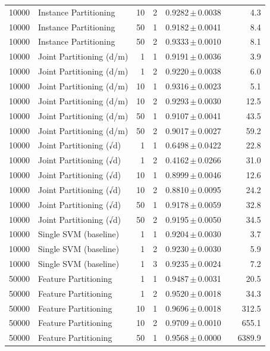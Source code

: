 \begin{table}[ht]
\begin{tabular}{rlrrccr}
10000 & Instance Partitioning & 10 & 2 & 0.9282\,$\pm$\,0.0038 &  & 4.3 \\
10000 & Instance Partitioning & 50 & 1 & 0.9182\,$\pm$\,0.0041 &  & 8.4 \\
10000 & Instance Partitioning & 50 & 2 & 0.9333\,$\pm$\,0.0010 &  & 8.1 \\
10000 & Joint Partitioning (d/m) & 1 & 1 & 0.9191\,$\pm$\,0.0036 &  & 3.9 \\
10000 & Joint Partitioning (d/m) & 1 & 2 & 0.9220\,$\pm$\,0.0038 &  & 6.0 \\
10000 & Joint Partitioning (d/m) & 10 & 1 & 0.9316\,$\pm$\,0.0023 &  & 5.1 \\
10000 & Joint Partitioning (d/m) & 10 & 2 & 0.9293\,$\pm$\,0.0030 &  & 12.5 \\
10000 & Joint Partitioning (d/m) & 50 & 1 & 0.9107\,$\pm$\,0.0041 &  & 43.5 \\
10000 & Joint Partitioning (d/m) & 50 & 2 & 0.9017\,$\pm$\,0.0027 &  & 59.2 \\
10000 & Joint Partitioning (√d) & 1 & 1 & 0.6498\,$\pm$\,0.0422 &  & 22.8 \\
10000 & Joint Partitioning (√d) & 1 & 2 & 0.4162\,$\pm$\,0.0266 &  & 31.0 \\
10000 & Joint Partitioning (√d) & 10 & 1 & 0.8999\,$\pm$\,0.0046 &  & 12.6 \\
10000 & Joint Partitioning (√d) & 10 & 2 & 0.8810\,$\pm$\,0.0095 &  & 24.2 \\
10000 & Joint Partitioning (√d) & 50 & 1 & 0.9178\,$\pm$\,0.0059 &  & 32.8 \\
10000 & Joint Partitioning (√d) & 50 & 2 & 0.9195\,$\pm$\,0.0050 &  & 34.5 \\
10000 & Single SVM (baseline) & 1 & 1 & 0.9204\,$\pm$\,0.0030 &  & 3.7 \\
10000 & Single SVM (baseline) & 1 & 2 & 0.9230\,$\pm$\,0.0030 &  & 5.9 \\
10000 & Single SVM (baseline) & 1 & 3 & 0.9235\,$\pm$\,0.0024 &  & 7.2 \\
50000 & Feature Partitioning & 1 & 1 & 0.9487\,$\pm$\,0.0031 &  & 20.5 \\
50000 & Feature Partitioning & 1 & 2 & 0.9520\,$\pm$\,0.0018 &  & 34.3 \\
50000 & Feature Partitioning & 10 & 1 & 0.9696\,$\pm$\,0.0018 &  & 312.5 \\
50000 & Feature Partitioning & 10 & 2 & 0.9709\,$\pm$\,0.0010 &  & 655.1 \\
50000 & Feature Partitioning & 50 & 1 & 0.9568\,$\pm$\,0.0000 &  & 6389.9 \\

\end{tabular}
\end{table}
